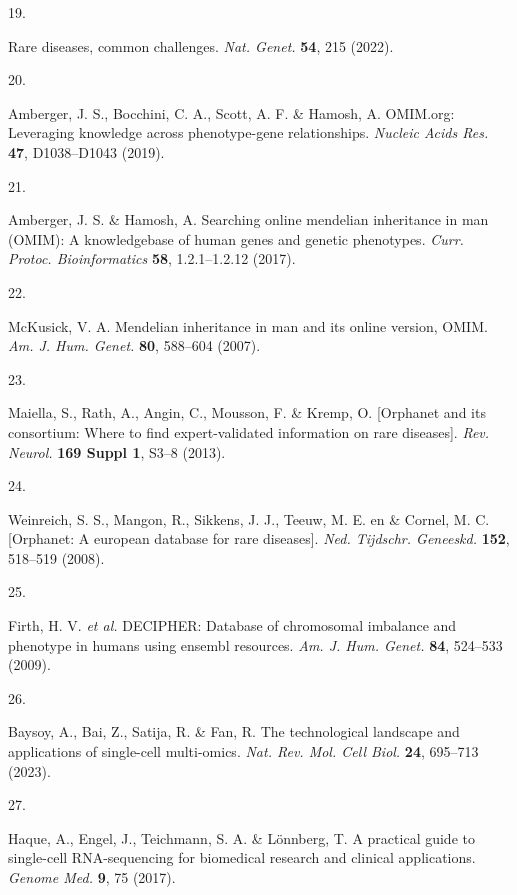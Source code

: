 \documentclass[
sn-nature
]{sn-jnl}
\newlength{\cslhangindent}
\newlength{\csllabelwidth}
\newenvironment{CSLReferences}[2] %
 {\begin{list}{}{%
  \setlength{\itemindent}{0pt}
  \setlength{\leftmargin}{0pt}
  \setlength{\parsep}{0pt}
  \ifodd #1
   \setlength{\leftmargin}{\cslhangindent}
   \setlength{\itemindent}{-1\cslhangindent}
  \fi
  \setlength{\itemsep}{#2\baselineskip}}}
 {\end{list}}
\newcommand{\CSLLeftMargin}[1]{\parbox[t]{\csllabelwidth}{\strut#1\strut}}
\newcommand{\CSLRightInline}[1]{\parbox[t]{\linewidth - \csllabelwidth}{\strut#1\strut}}
\begin{document}
\begin{CSLReferences}{0}{0}
\CSLLeftMargin{19. }%
\CSLRightInline{Rare diseases, common challenges. \emph{Nat. Genet.}
\textbf{54}, 215 (2022).}

\CSLLeftMargin{20. }%
\CSLRightInline{Amberger, J. S., Bocchini, C. A., Scott, A. F. \&
Hamosh, A. {OMIM.org}: Leveraging knowledge across phenotype-gene
relationships. \emph{Nucleic Acids Res.} \textbf{47}, D1038--D1043
(2019).}

\CSLLeftMargin{21. }%
\CSLRightInline{Amberger, J. S. \& Hamosh, A. Searching online mendelian
inheritance in man ({OMIM)}: A knowledgebase of human genes and genetic
phenotypes. \emph{Curr. Protoc. Bioinformatics} \textbf{58},
1.2.1--1.2.12 (2017).}

\CSLLeftMargin{22. }%
\CSLRightInline{McKusick, V. A. Mendelian inheritance in man and its
online version, {OMIM}. \emph{Am. J. Hum. Genet.} \textbf{80}, 588--604
(2007).}

\CSLLeftMargin{23. }%
\CSLRightInline{Maiella, S., Rath, A., Angin, C., Mousson, F. \& Kremp,
O. {[}Orphanet and its consortium: Where to find expert-validated
information on rare diseases{]}. \emph{Rev. Neurol.} \textbf{169 Suppl
1}, S3--8 (2013).}

\CSLLeftMargin{24. }%
\CSLRightInline{Weinreich, S. S., Mangon, R., Sikkens, J. J., Teeuw, M.
E. en \& Cornel, M. C. {[}Orphanet: A european database for rare
diseases{]}. \emph{Ned. Tijdschr. Geneeskd.} \textbf{152}, 518--519
(2008).}

\CSLLeftMargin{25. }%
\CSLRightInline{Firth, H. V. \emph{et al.} {DECIPHER}: Database of
chromosomal imbalance and phenotype in humans using ensembl resources.
\emph{Am. J. Hum. Genet.} \textbf{84}, 524--533 (2009).}

\CSLLeftMargin{26. }%
\CSLRightInline{Baysoy, A., Bai, Z., Satija, R. \& Fan, R. The
technological landscape and applications of single-cell multi-omics.
\emph{Nat. Rev. Mol. Cell Biol.} \textbf{24}, 695--713 (2023).}

\CSLLeftMargin{27. }%
\CSLRightInline{Haque, A., Engel, J., Teichmann, S. A. \& Lönnberg, T. A
practical guide to single-cell {RNA-sequencing} for biomedical research
and clinical applications. \emph{Genome Med.} \textbf{9}, 75 (2017).}


\end{CSLReferences}
\end{document}
